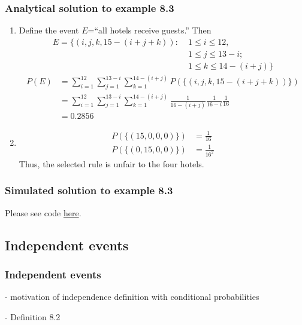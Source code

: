 \begin{frame}
    \frametitle{Analytical solution to example 8.3}

    \tiny
    \begin{enumerate}[a]
		\conti
        \item 
			Define the event $E$=``all hotels receive guests.'' Then
    		\begin{align*}
        		E=\{(i,j,k,15-(i+j+k)):\;&1\le i\le 12,\\
                                      	 &1\le j\le 13-i;\\
                                      	 &1\le k\le 14-(i+j)\}
            \end{align*}
    		\begin{align*}
				P(E)&=\sum_{i=1}^{12}\sum_{j=1}^{13-i}\sum_{k=1}^{14-(i+j)}P(\{(i,j,k,15-(i+j+k))\})\\
                    &=\sum_{i=1}^{12}\sum_{j=1}^{13-i}\sum_{k=1}^{14-(i+j)}\frac{1}{16-(i+j)}\frac{1}{16-i}\frac{1}{16}\\
                    &=0.2856
            \end{align*}
        \item
    		\begin{align*}
                P(\{(15,0,0,0)\})&=\frac{1}{16}\\
                P(\{(0,15,0,0)\})&=\frac{1}{16^2}
            \end{align*}
            Thus, the selected rule is unfair to the four hotels.
    \end{enumerate}
    \normalsize

\end{frame}

\begin{frame}[fragile]
    \frametitle{Simulated solution to example 8.3}

    Please see code \href{https://joacorapela.github.io/gcnuBridging2023/auto_examples/foundations/plot_example8_3.html#sphx-glr-auto-examples-foundations-plot-example8-3-py}{here}.

\end{frame}

\subsection{Independent events}

\begin{frame}
    \frametitle{Independent events}

- motivation of independence definition with conditional probabilities

- Definition 8.2

\end{frame}

